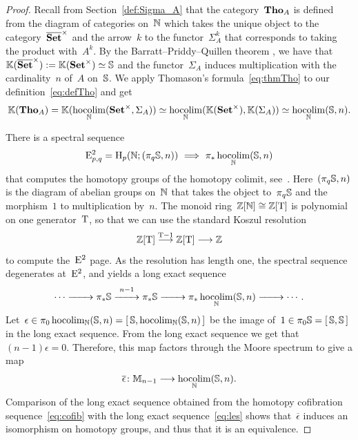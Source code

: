 \begin{proof} Recall from Section~\ref{def:Sigma_A} that the category~$\mathbf{Tho}_A$ is defined from the diagram of categories on~$\mathbb{N}$ which takes the unique object to the category~$\overline{\mathbf{Set}}^\times$ and the arrow~$k$ to the functor~$\Sigma_A^k$ that corresponds to taking the product with~$A^k$. 
By the Barratt--Priddy--Quillen theorem \cite{BP72}, we have that~$\mathbb{K}(\overline{\mathbf{Set}}^\times):=\mathbb{K}(\mathbf{Set}^\times)\simeq\mathbb{S}$ and  the functor~$\Sigma_A$  induces multiplication with the cardinality~$n$ of~$A$ on~$\mathbb{S}$. 
We apply Thomason's formula~\eqref{eq:thmTho} to our definition~\eqref{eq:defTho} and get
\[
\mathbb{K}(\mathbf{Tho}_A)
=
\mathbb{K}(\operatorname*{hocolim}_{\mathbb{N}}(\mathbf{Set}^\times,\Sigma_A))
\simeq
\operatorname*{hocolim}_{\mathbb{N}}(\mathbb{K}(\mathbf{Set}^\times),\mathbb{K}(\Sigma_A))
\simeq
\operatorname*{hocolim}_{\mathbb{N}}(\mathbb{S},n).
\]

There is a spectral sequence
\[
\rmE^2_{p,q}=\rmH_p(\bbN;(\pi_q\bbS,n))\ \Longrightarrow\ \pi_*\hocolim_{\bbN}(\bbS,n)
\]
that computes the homotopy groups of the homotopy colimit, see~\cite[Sec.~3]{Thomason}. Here~$(\pi_q\mathbb{S},n)$ is the diagram of abelian groups on~$\mathbb{N}$ that takes the object to~$\pi_q\mathbb{S}$ and the morphism~$1$ to multiplication by~$n$. 
The monoid ring~$\mathbb{Z}[\mathbb{N}]\cong\mathbb{Z}[\mathrm{T}]$ is polynomial on one generator~$\mathrm{T}$, so that we can use the standard Koszul resolution 
\[
\mathbb{Z}[\mathrm{T}]\stackrel{\mathrm{T}-1}{\longrightarrow} \mathbb{Z}[\mathrm{T}]\longrightarrow\mathbb{Z}
\] 
to compute the~$\mathrm{E}^2$ page. As the resolution has length one, the spectral sequence degenerates at~$\mathrm{E}^2$, and yields a long exact sequence 
\begin{equation}\label{eq:les}
\cdots
\xrightarrow{\hspace*{2em}}\pi_*\mathbb{S}
\overset{n-1}{\xrightarrow{\hspace*{2em}}}\pi_*\mathbb{S}
\xrightarrow{\hspace*{2em}}\pi_*\operatorname*{hocolim}_{\mathbb{N}}(\mathbb{S},n)
\xrightarrow{\hspace*{2em}}\cdots.
\end{equation}
Let~$\epsilon\in \pi_0\operatorname*{hocolim}_{\mathbb{N}}(\mathbb{S},n)=[\,\mathbb{S},\operatorname*{hocolim}_{\mathbb{N}}(\mathbb{S},n)\,]$ be the image of~$1\in \pi_0\mathbb{S}=[\,\mathbb{S},\mathbb{S}\,]$ in the long exact sequence. 
From the long exact sequence we get that~$(n-1)\epsilon=0$. Therefore, this map factors through the Moore spectrum to give a map
\[
\overline\epsilon\colon\mathbb{M}_{n-1}\longrightarrow\operatorname*{hocolim}_{\mathbb{N}}(\mathbb{S},n).
\]
Comparison of the long exact sequence obtained from the homotopy cofibration sequence~\eqref{eq:cofib} with the long exact sequence~\eqref{eq:les} shows that~$\overline\epsilon$ induces an isomorphism on homotopy groups, and thus that it is an equivalence. 
\end{proof}

